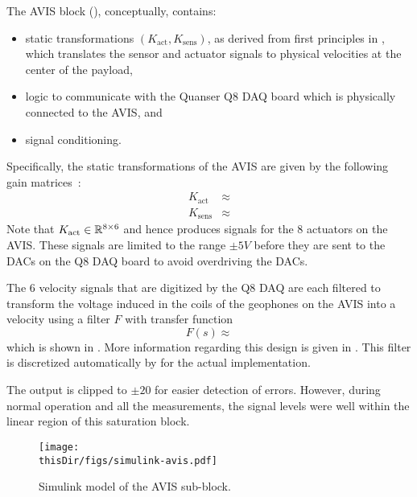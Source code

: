 The \gls{AVIS} block (), conceptually, contains:
\begin{itemize}
  \item static transformations $(K_{\mathrm{act}}, K_{\mathrm{sens}})$, as derived from first principles in \citep{Rademakers2005MSc}, which translates the sensor and actuator signals to physical velocities at the center of the payload,
  \item logic to communicate with the Quanser Q8 \gls{DAQ} board which is physically connected to the \gls{AVIS}, and
  \item signal conditioning.
\end{itemize}

Specifically, the static transformations of the \gls{AVIS} are given by the following gain matrices~\citep[Appendix A.4]{Rademakers2005MSc}:
\begin{align}
  K_{\mathrm{act}}    & \approx \\
  K_{\mathrm{sens}} & \approx 
\end{align}
Note that $K_{\mathrm{act}} \in \mathbb{R}^{8\times6}$ and hence produces signals for the $8$ actuators on the \gls{AVIS}.
These signals are limited to the range $\pm 5\unit{V}$ before they are sent to the \glspl{DAC} on the Q8 \gls{DAQ} board to avoid overdriving the \glspl{DAC}.

The $6$ velocity signals that are digitized by the Q8 \gls{DAQ} are each filtered to transform the voltage induced in the coils of the geophones on the \gls{AVIS} into a velocity using a filter $F$ with transfer function
\begin{equation}
  F(s) \approx 
\end{equation}
which is shown in .
More information regarding this design is given in \citep[Appendix A.3]{Rademakers2005MSc}.
This filter is discretized automatically by \Simulink for the actual implementation.

The output  is clipped to $\pm 20$ for easier detection of errors.
However, during normal operation and all the measurements, the signal levels were well within the linear region of this saturation block.

\begin{figure}
\setlength\figurewidth{\columnwidth}
  \texttt{[image: \\thisDir/figs/simulink-avis.pdf]}
  \caption{Simulink model of the AVIS sub-block.}
  \label{fig:avis:simulink:avis}
\end{figure}

